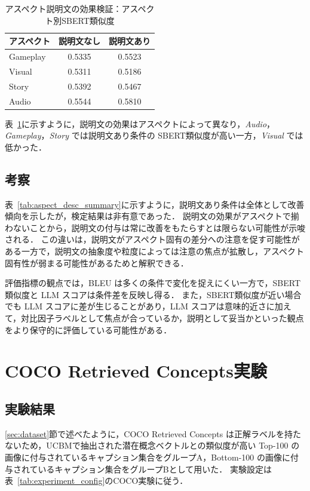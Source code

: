 \begin{table}[htbp]
  \centering
  \caption{アスペクト説明文の効果検証：アスペクト別SBERT類似度}
  \label{tab:aspect_desc_aspect}
  \begin{tabular}{lcc}
    \toprule
    アスペクト & 説明文なし & 説明文あり \\
    \midrule
    Gameplay & 0.5335 & 0.5523 \\
    Visual & 0.5311 & 0.5186 \\
    Story & 0.5392 & 0.5467 \\
    Audio & 0.5544 & 0.5810 \\
    \bottomrule
  \end{tabular}
\end{table}

表~\ref{tab:aspect_desc_aspect}に示すように，説明文の効果はアスペクトによって異なり，\textit{Audio}，\textit{Gameplay}，\textit{Story} では説明文あり条件の SBERT類似度が高い一方，\textit{Visual} では低かった．

\subsection{考察}
表~\ref{tab:aspect_desc_summary}に示すように，説明文あり条件は全体として改善傾向を示したが，検定結果は非有意であった．
説明文の効果がアスペクトで揃わないことから，説明文の付与は常に改善をもたらすとは限らない可能性が示唆される．
この違いは，説明文がアスペクト固有の差分への注意を促す可能性がある一方で，説明文の抽象度や粒度によっては注意の焦点が拡散し，アスペクト固有性が弱まる可能性があるためと解釈できる．

評価指標の観点では，BLEU は多くの条件で変化を捉えにくい一方で，SBERT類似度と LLM スコアは条件差を反映し得る．
また，SBERT類似度が近い場合でも LLM スコアに差が生じることがあり，LLM スコアは意味的近さに加えて，対比因子ラベルとして焦点が合っているか，説明として妥当かといった観点をより保守的に評価している可能性がある．

\section{COCO Retrieved Concepts実験}
\label{sec:coco_experiment}
\subsection{実験結果}
\ref{sec:dataset}節で述べたように，COCO Retrieved Concepts は正解ラベルを持たないため，UCBMで抽出された潜在概念ベクトルとの類似度が高い Top-100 の画像に付与されているキャプション集合をグループA，Bottom-100 の画像に付与されているキャプション集合をグループBとして用いた．
実験設定は表~\ref{tab:experiment_config}のCOCO実験に従う．

